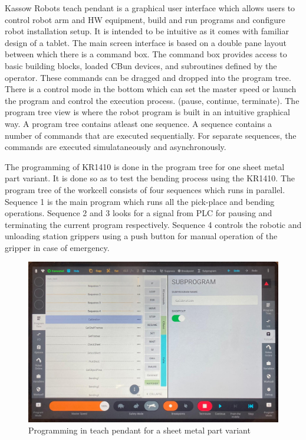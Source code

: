 Kassow Robots teach pendant is a graphical user interface which allows users
to control robot arm and HW equipment, build and run programs and configure robot installation setup.
It is intended to be intuitive as it comes with familiar design of a tablet. The main screen interface is based
on a double pane layout between which there is a command box. The command box provides access to basic building blocks,
loaded CBun devices, and subroutines defined by the operator. These commands can be dragged and dropped into the program
tree. \cite[page 15]{kassow-software-manual}
There is a control mode in the bottom which can set the master speed or launch the program and control the execution process. (pause, continue, terminate). The program tree view is where the robot program is built in an intuitive graphical way.
A program tree contains atleast one sequence. A sequence contains a number of commands that are executed sequentially.
For separate sequences, the commands are executed simulataneously and asynchronously. \cite[page 20]{kassow-software-manual}


The programming of KR1410 is done in the program tree for one sheet metal part variant.
It is done so as to test the bending process using the KR1410.
The program tree of the workcell consists of four sequences which runs in parallel.
Sequence 1 is the main program which runs all the pick-place and bending operations.
Sequence 2 and 3 looks for a signal from PLC for pausing and terminating the current program
respectively. Sequence 4 controls the robotic and unloading station grippers using a push button
for manual operation of the gripper in case of emergency.

\begin{figure}[h]
    \centering
    \includegraphics[width=\textwidth]{figures/programtree.png}
    \caption{Programming in teach pendant for a sheet metal part variant}
    \label{fig:programtree}
\end{figure}

